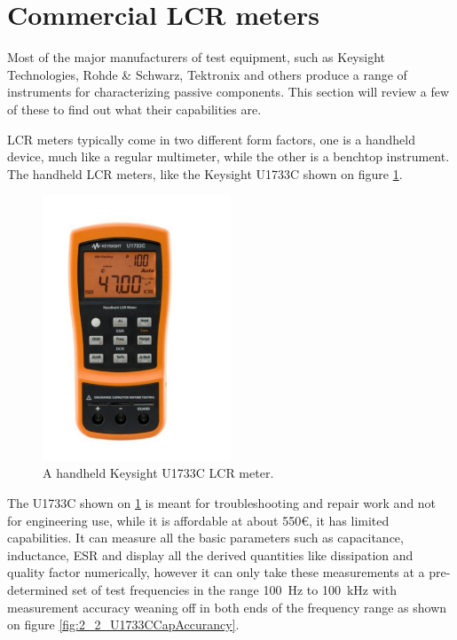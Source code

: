 \section{Commercial LCR meters} \label{sec:CommercialLCRMeters}
Most of the major manufacturers of test equipment, such as Keysight Technologies, Rohde \& Schwarz, Tektronix and others produce a range of instruments for characterizing passive components. This section will review a few of these to find out what their capabilities are. 

LCR meters typically come in two different form factors, one is a handheld device, much like a regular multimeter, while the other is a benchtop instrument. The handheld LCR meters, like the Keysight U1733C\cite{KeysightU1733C} shown on figure \ref{fig:2_2_U1733C}.
\begin{figure}[H]
    \centering
    \includegraphics[clip, trim=0 50 0 50, width=0.5\textwidth]{Sections/2_ProblemAnalysis/FIgures/KeysightU1733C.pdf}
    \caption{A handheld Keysight U1733C LCR meter.\cite{KeysightU1733C}}
    \label{fig:2_2_U1733C}
\end{figure}
The U1733C shown on \ref{fig:2_2_U1733C} is meant for troubleshooting and repair work and not for engineering use, while it is affordable at about 550€, it has limited capabilities. It can measure all the basic parameters such as capacitance, inductance, ESR and display all the derived quantities like dissipation and quality factor numerically, however it can only take these measurements at a pre-determined set of test frequencies in the range \SI[]{100}{\hertz} to \SI[]{100}{\kilo\hertz} with measurement accuracy weaning off in both ends of the frequency range as shown on figure \ref{fig:2_2_U1733CCapAccurancy}.

